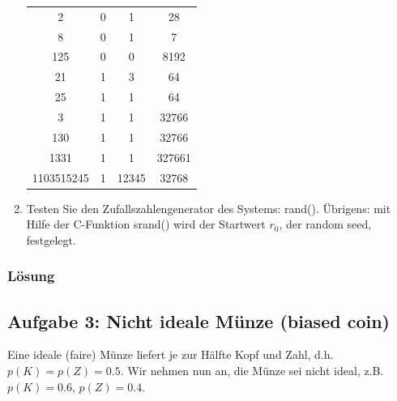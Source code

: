 \begin{enumerate}
\begin{center}
\begin{tabular}{c c c c}
            2 & 0 & 1 & 28  \\
            8 & 0 & 1 & 7  \\
            125 & 0 & 0 & 8192  \\
            21 & 1 & 3 & 64  \\
            25 & 1 & 1 & 64  \\
            3 & 1 & 1 & 32766  \\
            130 & 1 & 1 & 32766  \\
            1331 & 1 & 1 & 327661  \\
            1103515245 & 1 & 12345 & 32768  \\

            \hline
            \hline
       \end{tabular}
   \end{center}
\item Testen Sie den Zufallszahlengenerator des Systems: rand(). Übrigens: mit Hilfe der C-Funktion srand() wird der Startwert $r_0$, der random seed, festgelegt.

\end{enumerate}

\subsubsection{Lösung}


\noindent\makebox[\linewidth]{\rule{\paperwidth}{0.4pt}}

\noindent\makebox[\linewidth]{\rule{\paperwidth}{0.4pt}}

\noindent\makebox[\linewidth]{\rule{\paperwidth}{0.4pt}}

\noindent\makebox[\linewidth]{\rule{\paperwidth}{0.4pt}}


\subsection{Aufgabe 3: Nicht ideale Münze (biased coin)}
Eine ideale (faire) Münze liefert je zur Hälfte Kopf und Zahl, d.h. $p(K) = p(Z) = 0.5$. Wir nehmen nun an, die Münze sei nicht ideal, z.B.$ p(K) = 0.6$, $p(Z) = 0.4$.

